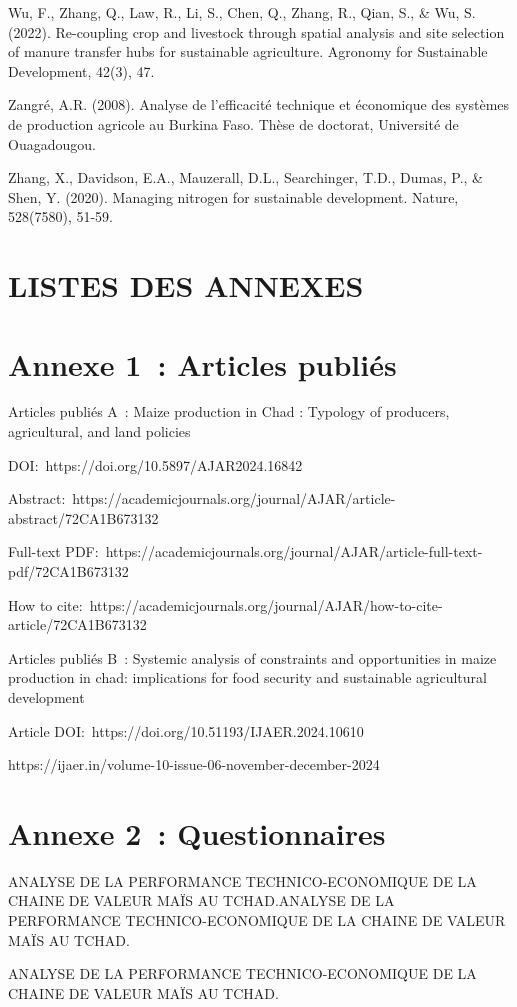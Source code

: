 \documentclass[12pt,oneside]{report}
\begin{document}
Wu, F., Zhang, Q., Law, R., Li, S., Chen, Q., Zhang, R., Qian, S., \& Wu, S. (2022). Re-coupling crop and livestock through spatial analysis and site selection of manure transfer hubs for sustainable agriculture. Agronomy for Sustainable Development, 42(3), 47.

Zangré, A.R. (2008). Analyse de l'efficacité technique et économique des systèmes de production agricole au Burkina Faso. Thèse de doctorat, Université de Ouagadougou.

Zhang, X., Davidson, E.A., Mauzerall, D.L., Searchinger, T.D., Dumas, P., \& Shen, Y. (2020). Managing nitrogen for sustainable development. Nature, 528(7580), 51-59.

\chapter{LISTES DES ANNEXES}
\chapter{Annexe 1 : Articles publiés}
Articles publiés A : Maize production in Chad : Typology of producers, agricultural, and land policies

DOI: https://doi.org/10.5897/AJAR2024.16842

Abstract: https://academicjournals.org/journal/AJAR/article-abstract/72CA1B673132

Full-text PDF: https://academicjournals.org/journal/AJAR/article-full-text-pdf/72CA1B673132

How to cite: https://academicjournals.org/journal/AJAR/how-to-cite-article/72CA1B673132

Articles publiés B : Systemic analysis of constraints and opportunities in maize production in chad: implications for food security and sustainable agricultural development

Article DOI: https://doi.org/10.51193/IJAER.2024.10610

https://ijaer.in/volume-10-issue-06-november-december-2024

\chapter{Annexe 2 : Questionnaires}
ANALYSE DE LA PERFORMANCE TECHNICO-ECONOMIQUE DE LA CHAINE DE VALEUR  MAÏS AU TCHAD.ANALYSE DE LA PERFORMANCE TECHNICO-ECONOMIQUE DE LA CHAINE DE VALEUR  MAÏS AU TCHAD.

ANALYSE DE LA PERFORMANCE TECHNICO-ECONOMIQUE DE LA CHAINE DE VALEUR  MAÏS AU TCHAD.
\end{document}
